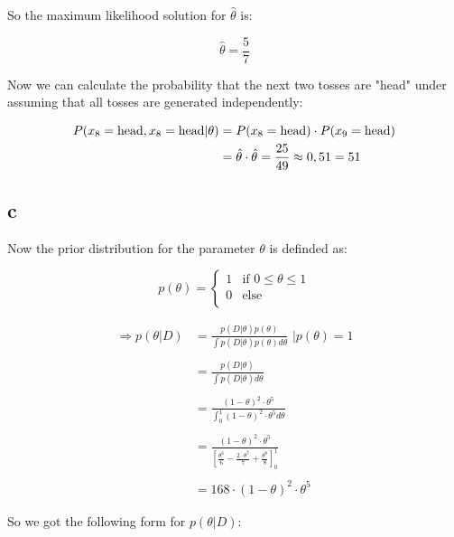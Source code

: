 So the maximum likelihood solution for $\hat{\theta}$ is:
\begin{center}
    \begin{equation}
        \hat{\theta}=\frac{5}{7}
    \end{equation}
\end{center}

Now we can calculate the probability that the next two tosses are "head" under assuming that all tosses are generated independently:

\begin{align*}
    P(x_{8}=\text{head}, x_{8}=\text{head}|\theta)&=P(x_{8}=\text{head})\cdot P(x_{9}=\text{head})\\
    &=\hat{\theta}\cdot\hat{\theta}=\frac{25}{49}\approx0,51=51\protect
\end{align*}

\subsection{c}
Now the prior distribution for the parameter $\theta$ is definded as:\\
\begin{center}
        \[p(\theta)=\begin{cases}
        1 & \text{if } 0\le\theta\le1\\
        0& \text{else} \\
\end{cases}\]
\end{center}
    
\begin{align*}
    \Rightarrow p(\theta|D)&=\frac{p(D|\theta)p(\theta)}{\int p(D|\theta)p(\theta)d\theta}\text{      |}p(\theta)=1\\
    \\
    &=\frac{p(D|\theta)}{\int p(D|\theta)d\theta}\\
    \\
    &=\frac{(1-\theta)^{2}\cdot\theta^{5}}{\int_{0}^{1}(1-\theta)^{2}\cdot\theta^{5}d\theta}\\
    \\
    &=\frac{(1-\theta)^{2}\cdot\theta^{5}}{[\frac{\theta^{6}}{6}-\frac{2\cdot\theta^{7}}{7}+\frac{\theta^{8}}{8}]_{0}^{1}}\\
    \\
    &=168\cdot(1-\theta)^2\cdot\theta^{5}
\end{align*}

So we got the following form for $p(\theta|D)$:


